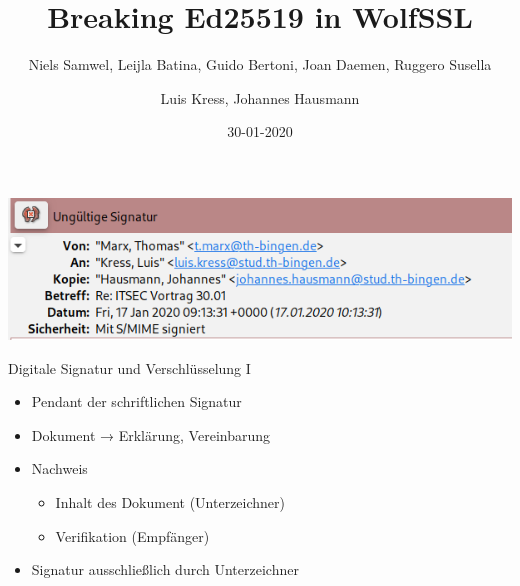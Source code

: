 \documentclass[
  10pt,
  ignorenonframetext,
  aspectratio=43,
]{beamer}
\title{Breaking Ed25519 in WolfSSL}
\subtitle{Niels Samwel, Leijla Batina, Guido Bertoni, Joan Daemen,
Ruggero Susella}
\author{Luis Kress, Johannes Hausmann}
\date{30-01-2020}
\institute{Technische Hochschule Bingen}
\providecommand{\tightlist}{%
  \setlength{\itemsep}{0pt}\setlength{\parskip}{0pt}}
\begin{document}
\frame{\titlepage}

\begin{frame}[allowframebreaks]
  \tableofcontents[hideallsubsections]
\end{frame}
\begin{frame}
\includegraphics{Abbildungen/ksig.png}
\end{frame}

\begin{frame}{Digitale Signatur und Verschlüsselung I}
\protect\hypertarget{digitale-signatur-und-verschluxfcsselung-i}{}
\begin{itemize}
\tightlist
\item
  Pendant der schriftlichen Signatur
\end{itemize}

\pause

\begin{itemize}
\tightlist
\item
  Dokument → Erklärung, Vereinbarung
\end{itemize}

\pause

\begin{itemize}
\tightlist
\item
  Nachweis

  \begin{itemize}
  \tightlist
  \item
    Inhalt des Dokument (Unterzeichner)
  \item
    Verifikation (Empfänger)
  \end{itemize}
\end{itemize}

\pause

\begin{itemize}
\tightlist
\item
  Signatur ausschließlich durch Unterzeichner
\end{itemize}

\pause

\end{frame}
\end{document}
